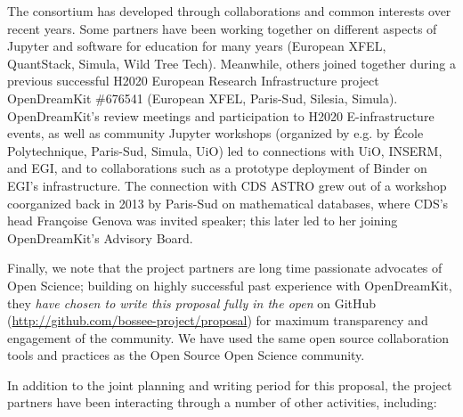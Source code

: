 The consortium has developed through collaborations and common interests over recent years.
Some partners have been working together on different aspects of Jupyter
and software for education for many years (European XFEL, QuantStack, Simula, Wild Tree Tech).
Meanwhile, others joined together during a previous successful
H2020 European Research Infrastructure project OpenDreamKit \#676541 (European XFEL,
Paris-Sud, Silesia, Simula).
OpenDreamKit's review meetings and participation to H2020
E-infrastructure events, as well as community Jupyter workshops (organized by
e.g. by \'Ecole Polytechnique, Paris-Sud, Simula, UiO) led to
connections with UiO, INSERM, and EGI, and to collaborations such as a
prototype deployment of Binder on EGI's infrastructure. The connection
with CDS ASTRO grew out of a workshop coorganized back in 2013 by
Paris-Sud on mathematical databases, where CDS's head Françoise Genova
was invited speaker; this later led to her joining OpenDreamKit's
Advisory Board.

Finally, we note that the project partners are long time passionate
advocates of Open Science;
building on highly successful past experience with OpenDreamKit, they
\emph{have chosen to write this proposal fully in the open} on GitHub
(\href{http://github.com/bossee-project/proposal}{http://github.com/bossee-project/proposal}) for maximum transparency
and engagement of the community.
We have used the same open source collaboration tools and practices
as the Open Source Open Science community.

In addition to the joint planning and writing period for this
proposal, the project partners have been interacting through a number of
other activities, including:

